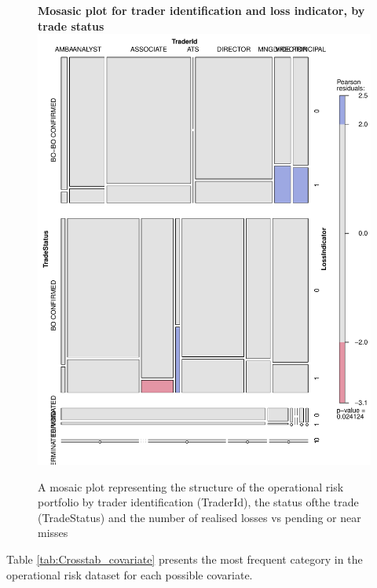 \documentclass{DissertateUSU}
\begin{document}
\singlespacing

\singlespacing
\begin{figure}
\centering
\textbf{Mosasic plot for trader identification and loss indicator, by trade status}
\includegraphics[width=\linewidth,height=0.75\linewidth]{Mosaic_Contingency.pdf}
\caption[Portfolio structure by trader, trade status and number of realised losses]{A mosaic plot representing the structure of the operational risk portfolio by trader identification (TraderId), the status ofthe trade (TradeStatus) and the number of realised losses vs pending or near misses}
\label{Mosaic_Contingency}
\end{figure}
\doublespacing

Table \ref{tab:Crosstab_covariate} presents the most frequent category
in the operational risk dataset for each possible covariate.
\end{document}
